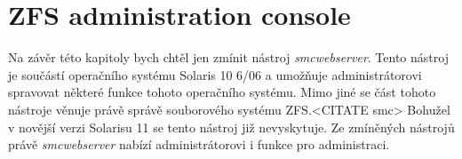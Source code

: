 \section{ZFS administration console}
Na závěr této kapitoly bych chtěl jen zmínit nástroj \emph{smcwebserver}. Tento nástroj je součástí operačního systému Solaris 10 6/06 a umožňuje administrátorovi spravovat některé funkce tohoto operačního systému. Mimo jiné se část tohoto nástroje věnuje právě správě souborového systému ZFS.<CITATE smc> Bohužel v novější verzi Solarisu 11 se tento nástroj již nevyskytuje. Ze zmíněných nástrojů právě \emph{smcwebserver} nabízí administrátorovi i funkce pro administraci.